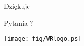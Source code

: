\documentclass[compress,red]{beamer}
\begin{document}
\begin{frame}{Dziękuje}

    \begin{center}
    Pytania ?
    \end{center}

    
    \begin{center}
    \texttt{[image: fig/WRlogo.ps]}
    \end{center}

\end{frame}
\end{document}

